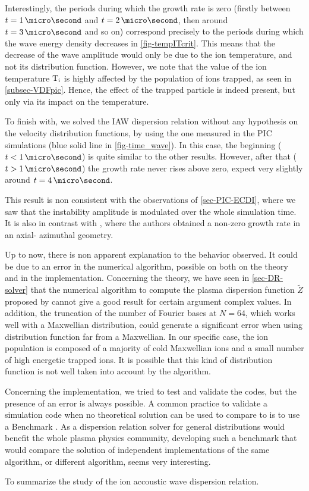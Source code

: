   Interestingly, the periods during which the growth rate is zero (firstly between $t=1\,\micro\second$ and $t=2\,\micro\second$, then around $t=3\,\micro\second$ and so on) correspond precisely to the periods during which the wave energy density decreases in \cref{fig-tempITcrit}.
  This means that the decrease of the wave amplitude would only be due to the ion temperature, and not its distribution function.
  However, we note that the value of the ion temperature $\mathrm{T_i}$ is highly affected by the population of ions trapped, as seen in \cref{subsec-VDFpic}.
  Hence, the effect of the trapped particle is indeed present, but only via its impact on the temperature.
  
  \vspace{1em}
  To finish with, we solved the \ac{IAW} dispersion relation without any hypothesis on the velocity distribution functions, by using the one measured in the PIC simulations (blue solid line in  \cref{fig-time_wave}).
  In this case, the beginning ($t < 1 \,\micro\second$) is quite similar to the other results.
  However, after that ($t > 1 \,\micro\second$) the growth rate never rises above zero, expect very slightly around $t=4\,\micro\second$.
  
  This result is non consistent with the observations of \cref{sec-PIC-ECDI}, where we saw that the instability amplitude is modulated over the whole simulation time.
  It is also in contrast with \citet{lafleur2018}, where the authors obtained a non-zero growth rate in an axial- azimuthal geometry.
  
  Up to now, there is non apparent explanation to the behavior observed.
  It could be due to an error in the numerical algorithm, possible on both on the theory and in the implementation.
  Concerning the theory, we have seen in \cref{sec-DR-solver} that the numerical algorithm to compute the plasma dispersion function $\tilde{Z}$ proposed by \citet{xie2013} cannot give a good result for certain argument complex values.
  In addition, the truncation of the number of Fourier bases at $N=64$, which works well with a Maxwellian distribution, could generate a significant error when using distribution function far from a Maxwellian.
  In our specific case, the ion population is composed of a majority of cold Maxwellian ions and a small number of high energetic trapped ions.
  It is possible that this kind of distribution function is not well taken into account by the algorithm.
  
  Concerning the implementation, we tried to test and validate the codes, but the presence of an error is always possible.
  A common practice to validate a simulation code when no theoretical solution can be used to compare to is to use a Benchmark \citep{turner2013}.
  As a dispersion relation solver for general distributions would benefit the whole plasma physics community, developing such a benchmark that would compare the solution of independent implementations of the same algorithm, or different algorithm, seems very interesting.
  
  \vspace{1ex}
  
  To summarize the study of the ion accoustic wave dispersion relation.
  
  \FloatBarrier